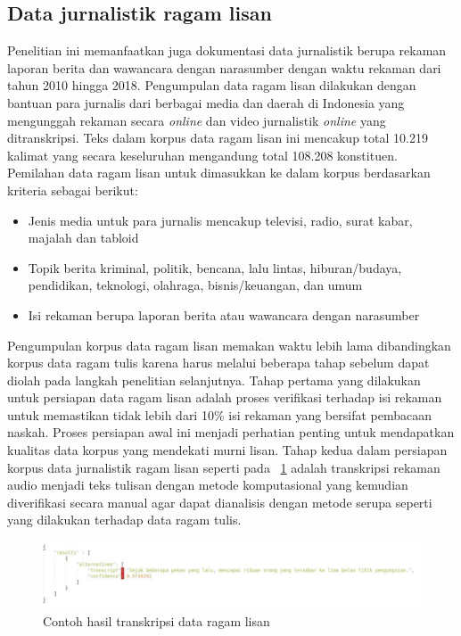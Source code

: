 \subsection{Data jurnalistik ragam lisan}
Penelitian ini memanfaatkan juga dokumentasi data jurnalistik berupa rekaman laporan berita dan wawancara dengan narasumber dengan waktu rekaman dari tahun 2010 hingga 2018. Pengumpulan data ragam lisan dilakukan dengan bantuan para jurnalis dari berbagai media dan daerah di Indonesia yang mengunggah rekaman secara \textit{online} dan video jurnalistik \textit{online} yang ditranskripsi. Teks dalam korpus data ragam lisan ini mencakup total 10.219 kalimat yang secara keseluruhan mengandung total 108.208 konstituen. Pemilahan data ragam lisan untuk dimasukkan ke dalam korpus berdasarkan kriteria sebagai berikut:

\begin{itemize}
	\item Jenis media untuk para jurnalis mencakup televisi, radio, surat kabar, majalah dan tabloid
	\item Topik berita kriminal, politik, bencana, lalu lintas, hiburan/budaya, pendidikan, teknologi, olahraga, bisnis/keuangan, dan umum
	\item Isi rekaman berupa laporan berita atau wawancara dengan narasumber
\end{itemize}

Pengumpulan korpus data ragam lisan memakan waktu lebih lama dibandingkan korpus data ragam tulis karena harus melalui beberapa tahap sebelum dapat diolah pada langkah penelitian selanjutnya. Tahap pertama yang dilakukan untuk persiapan data ragam lisan adalah proses verifikasi terhadap isi rekaman untuk memastikan tidak lebih dari 10\% isi rekaman yang bersifat pembacaan naskah. Proses persiapan awal ini menjadi perhatian penting untuk mendapatkan kualitas data korpus yang mendekati murni lisan. Tahap kedua dalam persiapan korpus data jurnalistik ragam lisan seperti pada \pic~\ref{fig:contoh-transkripsi-lisan} adalah transkripsi rekaman audio menjadi teks tulisan dengan metode komputasional yang kemudian diverifikasi secara manual agar dapat dianalisis dengan metode serupa seperti yang dilakukan terhadap data ragam tulis. 

\begin{figure}
	\centering \includegraphics[width=1
	\textwidth] {pics/contoh-transkripsi-lisan.png} 
	\caption{Contoh hasil transkripsi data ragam lisan} 
	\label{fig:contoh-transkripsi-lisan} 
\end{figure}

